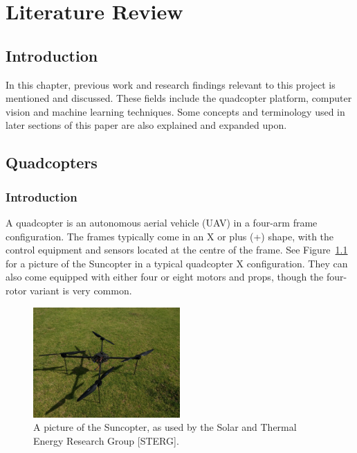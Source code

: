 \chapter{Literature Review}
\label{chap2}

\section{Introduction}

In this chapter, previous work and research findings relevant to this project is mentioned and discussed. These fields include the quadcopter platform, computer vision and machine learning techniques. Some concepts and terminology used in later sections of this paper are also explained and expanded upon.

\section{Quadcopters}

\subsection{Introduction}

A quadcopter is an autonomous aerial vehicle (UAV) in a four-arm frame configuration. The frames typically come in an X or plus (+) shape, with the control equipment and sensors located at the centre of the frame. See Figure~\ref{fig:chap2-quad} for a picture of the Suncopter in a typical quadcopter X configuration. They can also come equipped with either four or eight motors and props, though the four-rotor variant is very common.

\begin{figure}
  \centering
  \includegraphics[clip, trim = 0 0 30 20, width=0.5\textwidth]{figures/chapter2/quadcopter}
  \caption[A picture of the Suncopter, as used by STERG.]{A picture of the Suncopter, as used by the Solar and Thermal Energy Research Group [STERG].}
\label{fig:chap2-quad}
\end{figure}


